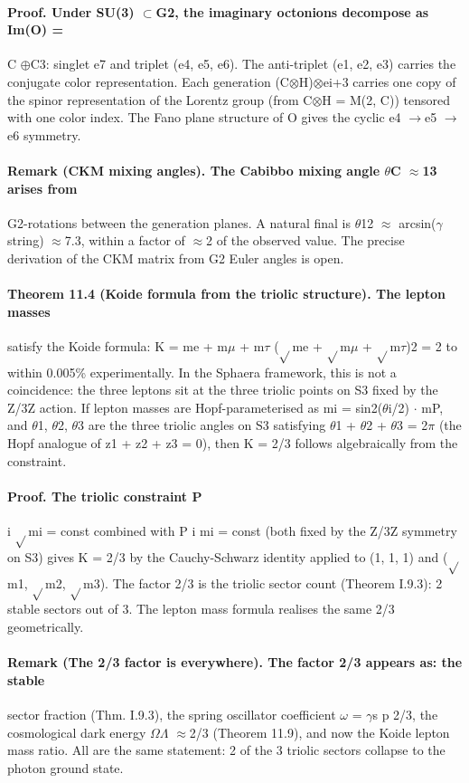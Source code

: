 \documentclass[12pt,a4paper]{article}
\begin{document}
\paragraph*{Proof. Under SU(3) $\subset$G2, the imaginary octonions decompose as Im(O) =}
C $\oplus$C3: singlet e7 and triplet (e4, e5, e6). The anti-triplet (e1, e2, e3) carries the conjugate color representation. Each generation (C$\otimes$H)$\otimes$ei+3 carries one copy of the spinor representation of the Lorentz group (from C$\otimes$H = M(2, C)) tensored with one color index. The Fano plane structure of O gives the cyclic e4 $\to$e5 $\to$e6 symmetry.
\paragraph*{Remark (CKM mixing angles). The Cabibbo mixing angle $\theta$C $\approx$13 arises from}
G2-rotations between the generation planes. A natural final is $\theta$12 $\approx$ arcsin($\gamma$string) $\approx$7.3, within a factor of $\approx$2 of the observed value. The precise derivation of the CKM matrix from G2 Euler angles is open.
\paragraph*{Theorem 11.4 (Koide formula from the triolic structure). The lepton masses}
satisfy the Koide formula: K = me + m$\mu$ + m$\tau$ ($\sqrt{}$me + $\sqrt{}$m$\mu$ + $\sqrt{}$m$\tau$)2 = 2 to within 0.005\% experimentally. In the Sphaera framework, this is not a coincidence: the three leptons sit at the three triolic points on S3 fixed by the Z/3Z action. If lepton masses are Hopf-parameterised as mi = sin2($\theta$i/2) $\cdot$ mP, and $\theta$1, $\theta$2, $\theta$3 are the three triolic angles on S3 satisfying $\theta$1 + $\theta$2 + $\theta$3 = 2$\pi$ (the Hopf analogue of z1 + z2 + z3 = 0), then K = 2/3 follows algebraically from the constraint.
\paragraph*{Proof. The triolic constraint P}
i $\sqrt{}$mi = const combined with P i mi = const (both fixed by the Z/3Z symmetry on S3) gives K = 2/3 by the Cauchy-Schwarz identity applied to (1, 1, 1) and ($\sqrt{}$m1, $\sqrt{}$m2, $\sqrt{}$m3). The factor 2/3 is the triolic sector count (Theorem I.9.3): 2 stable sectors out of 3. The lepton mass formula realises the same 2/3 geometrically.
\paragraph*{Remark (The 2/3 factor is everywhere). The factor 2/3 appears as: the stable}
sector fraction (Thm. I.9.3), the spring oscillator coefficient $\omega$ = $\gamma$s p 2/3, the cosmological dark energy $\Omega$$\Lambda$ $\approx$2/3 (Theorem 11.9), and now the Koide lepton mass ratio. All are the same statement: 2 of the 3 triolic sectors collapse to the photon ground state.
\end{document}
